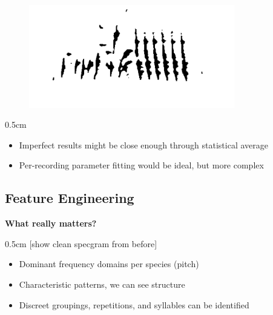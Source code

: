 \documentclass[t, xcolor={dvipsnames}]{beamer}
\begin{document}

\begin{frame}[fragile]
  \begin{figure}[!tfp]
    \centering
    \includegraphics[width=0.8\textwidth]{img/specgram-long-clean}
  \end{figure}

  \vspace{-1cm}

  \begin{addmargin}{0.5cm}
    \begin{itemize}
      \item Imperfect results might be close enough through statistical average
      \item Per-recording parameter fitting would be ideal, but more complex
    \end{itemize}
  \end{addmargin}
\end{frame}



\subsection{Feature Engineering}
\begin{frame}[fragile]
  \vspace{0.5cm}
  {\bfseries\Large What really matters?}\\
  \vspace{0.5cm}
  \begin{addmargin}{0.5cm}
    [show clean specgram from before]
    \begin{itemize}
      \item Dominant frequency domains per species (pitch)
      \item Characteristic patterns, we can see structure
      \item Discreet groupings, repetitions, and syllables can be identified
    \end{itemize}
  \end{addmargin}
\end{frame}
\end{document}
